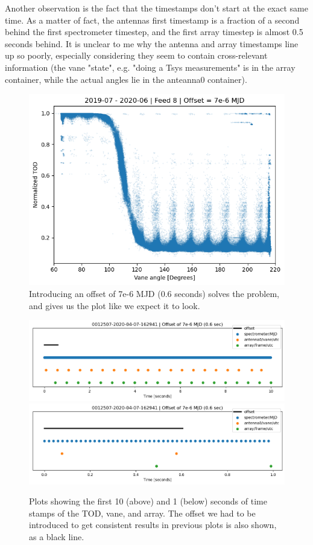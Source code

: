 \documentclass[10pt, a4paper]{article}
\begin{document}
Another observation is the fact that the timestamps don't start at the exact same time. As a matter of fact, the antennas first timestamp is a fraction of a second behind the first spectrometer timestep, and the first array timestep is almost 0.5 seconds behind. It is unclear to me why the antenna and array timestamps line up so poorly, especially considering they seem to contain cross-relevant information (the vane "state", e.g. "doing a Tsys measurements" is in the array container, while the actual angles lie in the anteanna0 container).

\begin{figure}[H]
    \centering
    \includegraphics[scale=0.6]{../plots/power_angle_all_7e-6.png}
    \caption{Introducing an offset of 7e-6 MJD (0.6 seconds) solves the problem, and gives us the plot like we expect it to look.}
    \label{fig:tod_angle_scatter_offset}
\end{figure}


\begin{figure}[H]
    \centering
    \includegraphics[scale=0.5]{../plots/times_20.png}
    \includegraphics[scale=0.5]{../plots/times_2.png}
    \caption{Plots showing the first 10 (above) and 1 (below) seconds of time stamps of the TOD, vane, and array. The offset we had to be introduced to get consistent results in previous plots is also shown, as a black line.}
    \label{fig:time}
\end{figure}
\end{document}
